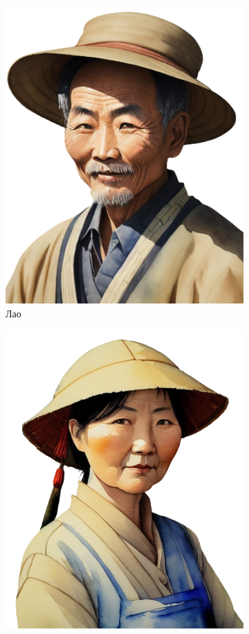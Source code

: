 \documentclass[a5paper,11pt]{memoir}
\begin{document}

\newpage
\begin{figure}[h]
	\begin{subfigure}{.3\textwidth}
		\centering
		\includegraphics[width=.8\linewidth]{images/lao-wang.png}
		\caption{Лао}
	\end{subfigure}%
	\begin{subfigure}{.3\textwidth}
		\centering
		\includegraphics[width=.8\linewidth]{images/lao-wife.png}

\end{subfigure}
\end{figure}
\end{document}
